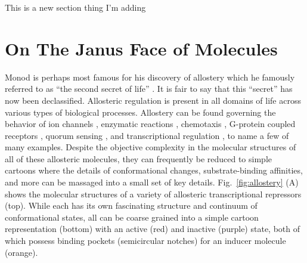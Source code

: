 \documentclass[12pt]{caltech_thesis}
\begin{document}
This is a new section thing I'm adding

\hypertarget{on-the-janus-face-of-molecules}{%
\section{On The Janus Face of
Molecules}\label{on-the-janus-face-of-molecules}}

Monod is perhaps most famous for his discovery of allostery which he
famously referred to as ``the second secret of life''
\autocite{ullmann2011,monod1965}. It is fair to say that this ``secret''
has now been declassified. Allosteric regulation is present in all
domains of life across various types of biological processes. Allostery
can be found governing the behavior of ion channels
\autocite{einav2017,auerbach2012}, enzymatic reactions
\autocite{einav2016}, chemotaxis \autocite{keymer2006}, G-protein
coupled receptors \autocite{canals2012}, quorum sensing
\autocite{swem2008}, and transcriptional regulation
\autocite{huang2018,lindsley2006a}, to name a few of many examples.
Despite the objective complexity in the molecular structures of all of
these allosteric molecules, they can frequently be reduced to simple
cartoons where the details of conformational changes, substrate-binding
affinities, and more can be massaged into a small set of key details.
Fig.~\ref{fig:allostery} (A) shows the molecular structures of a variety
of allosteric transcriptional repressors (top). While each has its own
fascinating structure and continuum of conformational states, all can be
coarse grained into a simple cartoon representation (bottom) with an
active (red) and inactive (purple) state, both of which possess binding
pockets (semicircular notches) for an inducer molecule (orange).
\end{document}
